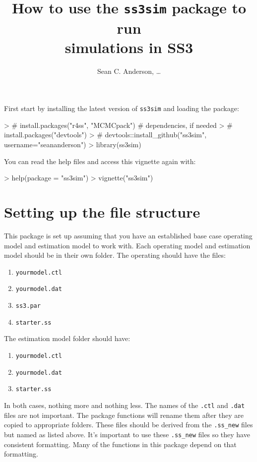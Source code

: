 \documentclass[12pt]{article}
\title{How to use the \texttt{ss3sim} package to run\\simulations in SS3}
\author{Sean C. Anderson, \ldots}
\date{}
\begin{document}
\maketitle

\noindent
First start by installing the latest version of \texttt{ss3sim} and loading the 
package:

\begin{Schunk}
\begin{Sinput}
> # install.packages("r4ss", "MCMCpack") # dependencies, if needed
> # install.packages("devtools")
> # devtools::install_github("ss3sim", username="seananderson")
> library(ss3sim)
\end{Sinput}
\end{Schunk}

\noindent
You can read the help files and access this vignette again with:

\begin{Schunk}
\begin{Sinput}
> help(package = "ss3sim")
> vignette("ss3sim")
\end{Sinput}
\end{Schunk}

\section*{Setting up the file structure}
This package is set up assuming that you have an established base case 
operating model and estimation model to work with. Each operating model and 
estimation model should be in their own folder. The operating should have the 
files:
\begin{enumerate}
  \item \texttt{yourmodel.ctl}
  \item \texttt{yourmodel.dat}
  \item \texttt{ss3.par}
  \item \texttt{starter.ss}
\end{enumerate}

\noindent
The estimation model folder should have:

\begin{enumerate}
  \item \texttt{yourmodel.ctl}
  \item \texttt{yourmodel.dat}
  \item \texttt{starter.ss}
\end{enumerate}

\noindent
In both cases, nothing more and nothing less. The names of the \texttt{.ctl} 
and \texttt{.dat} files are not important. The package functions will rename 
them after they are copied to appropriate folders. These files should be 
derived from the \texttt{.ss\_new} files but named as listed above. It's 
important to use these \texttt{.ss\_new} files so they have consistent 
formatting. Many of the functions in this package depend on that formatting.
\end{document}
